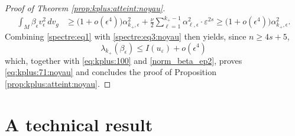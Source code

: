 \documentclass[10pt]{amsart}
\numberwithin{equation}{section}
\def\ep{{\varepsilon}}
\newcommand{\ve}{\varepsilon}
\def \ep{\epsilon}
\theoremstyle{plain}
\theoremstyle{remark}
\begin{document}
\begin{proof}[Proof of Theorem \ref{prop:kplus:atteint:noyau}]
\begin{equation}
\begin{aligned}
	\int_{M} \beta_{\ep} v_{\ep}^2\, dv_g & \ge \big(1 +o(\ep^4) \big) \alpha_{k_+,\ep}^2 +   \frac{\nu}{2} \sum_{\ell=1}^{k_+-1}\alpha_{\ell,\ep}^2 \cdot  \ve^{2s} \ge  \big(1 +o(\ep^4) \big) \alpha_{k_+,\ep}^2. 
	\end{aligned} 
\end{equation}
Combining \eqref{spectre:eq1} with  \eqref{spectre:eq3:noyau} then yields, since $n \ge 4s+5$,
\begin{equation*} 
\lambda_{k_+}(\beta_\ep) \le I(u_\ve)   + o(\ep^4)
\end{equation*}
which, together with \eqref{eq:kplus:100} and \eqref{norm_beta_ep2}, proves \eqref{eq:kplus:71:noyau} and concludes the proof of Proposition \ref{prop:kplus:atteint:noyau}.
\end{proof}

\appendix

\section{A technical result}
\end{document}
